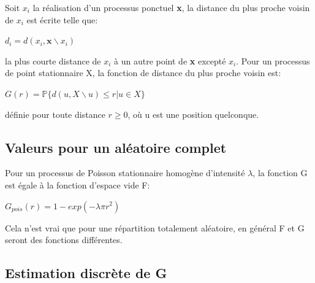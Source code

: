 \documentclass[stage2a]{tnreport}
\begin{document}
Soit \begin{math}x_i\end{math} la réalisation d'un processus ponctuel \textbf{x}, la distance du plus proche voisin de  \begin{math}x_i\end{math} est écrite telle que:
\begin{center}\begin{math} d_i = d(x_i,\textbf{x}\backslash x_i ) \end{math}\end{center}
la plus courte distance de \begin{math} x_i \end{math} à un autre point de \textbf{x} excepté \begin{math} x_i \end{math}.
Pour un processus de point stationnaire X, la fonction de distance du plus proche voisin est:
\begin{center}\begin{math} G(r) = \mathbb{P}\{ d(u,X\backslash u) \leq r | u \in X \} \end{math}\end{center}
définie pour toute distance \begin{math} r \geq 0 \end{math}, où u est une position quelconque.\\


\subsection{Valeurs pour un aléatoire complet}
Pour un processus de Poisson stationnaire  homogène d'intensité \begin{math}\lambda\end{math}, la fonction G est égale à la fonction d'espace vide F: 
\begin{center}\begin{math} G_{pois}(r) = 1 - exp(-\lambda \pi r^2) \end{math}\end{center}
Cela n'est vrai que pour une répartition totalement aléatoire, en général F et G seront des fonctions différentes.\\


\subsection{Estimation discrète de G}
\end{document}
